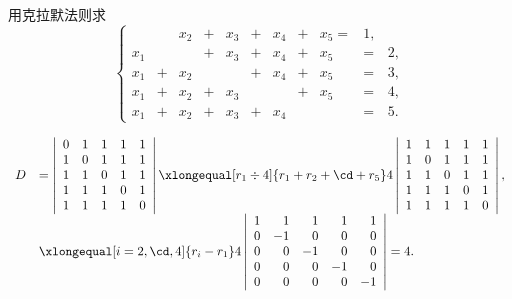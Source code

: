 \begin{frame}

\begin{testexample}
  用克拉默法则求
  $$
  \left\{
    \begin{array}{rcrcrcrcrcrc}
      &&x_2&+&x_3&+&x_4&+&x_5=&1,\\[0.1cm]
      x_1&&&+&x_3&+&x_4&+&x_5&=&2,\\[0.1cm]
      x_1&+&x_2&&&+&x_4&+&x_5&=&3,\\[0.1cm]
      x_1&+&x_2&+&x_3& & &+&x_5&=&4,\\[0.1cm]
      x_1&+&x_2&+& x_3&+&x_4&&&=&5.
    \end{array}
  \right.
  $$
\end{testexample}

\begin{jie}
$$
\begin{array}{rl}
  D &= \left|
      \begin{array}{rrrrr}
        0&1&1&1&1\\
        1&0&1&1&1\\
        1&1&0&1&1\\
        1&1&1&0&1\\
        1&1&1&1&0\\
      \end{array}
  \right|
  \xlongequal[r_1\div 4]{r_1+r_2+\cd+r_5}
  4 \left|
  \begin{array}{rrrrr}
    1&1&1&1&1\\
    1&0&1&1&1\\
    1&1&0&1&1\\
    1&1&1&0&1\\
    1&1&1&1&0\\
  \end{array}
  \right| , \\[0.3in]
    & \xlongequal[i=2,\cd, 4]{r_i-r_1}
      4 \left|
      \begin{array}{rrrrr}
        1&1&1&1&1\\
        0&-1&0&0&0\\
        0&0&-1&0&0\\
        0&0&0&-1&0\\
        0&0&0&0&-1\\
      \end{array}
  \right| = 4.
\end{array}
$$
\end{jie}



\end{frame}

